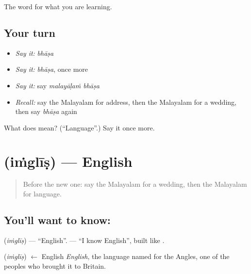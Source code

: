 \begin{grammarlens}[title={What you've built}]
The word for what you are learning.
\end{grammarlens}

\subsection*{Your turn}
\begin{itemize}
\raggedright
  \item \emph{Say it:} \emph{bhāṣa}
  \item \emph{Say it:} \emph{bhāṣa}, once more
  \item \emph{Say it:} say \emph{malayāḷaṁ bhāṣa}
  \item \emph{Recall:} say the Malayalam for address, then the Malayalam for a wedding, then say \emph{bhāṣa} again
\end{itemize}

\begin{tcolorbox}[breakable,colback=teal!4,colframe=teal!35!black,title={Before you move on}]
What does  mean? (\textquotedblleft{}Language\textquotedblright{}.) Say it once more.
\end{tcolorbox}
\section[\texorpdfstring{\ml{ഇംഗ്ലീഷ്} (iṁglīṣ)}{ഇംഗ്ലീഷ് (iṁglīṣ)}]{ (iṁglīṣ) — English}

\label{lesson:ML-C126-english}



\begin{quote}
Before the new one: say the Malayalam for a wedding, then the Malayalam for language.
\end{quote}

\subsection*{You'll want to know: }
\textbf{} (\emph{iṁglīṣ}) — \textquotedblleft{}English\textquotedblright{}. \textbf{  } — \textquotedblleft{}I know English\textquotedblright{}, built like \textbf{  }.

\begin{cousinweb}
\textbf{} (\emph{iṁglīṣ}) $\leftarrow$ English \emph{English}, the language named for the Angles, one of the peoples who brought it to Britain.
\end{cousinweb}


